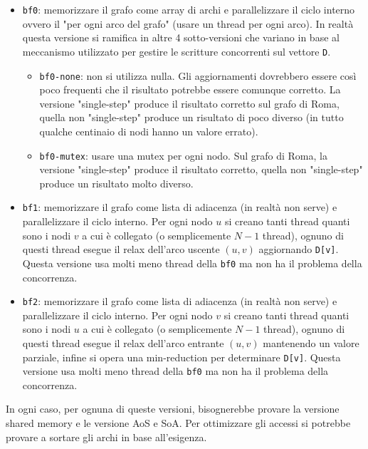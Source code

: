 \documentclass{article}
\begin{document}
	\begin{itemize}
		\item \texttt{bf0}: memorizzare il grafo come array di archi e parallelizzare il ciclo interno ovvero il "per ogni arco del grafo" (usare un thread per ogni arco). In realtà questa versione si ramifica in altre 4 sotto-versioni che variano in base al meccanismo utilizzato per gestire le scritture concorrenti sul vettore \texttt{D}.
		\begin{itemize}
			\item \texttt{bf0-none}: non si utilizza nulla. Gli aggiornamenti dovrebbero essere così poco frequenti che il risultato potrebbe essere comunque corretto. La versione "single-step" produce il risultato corretto sul grafo di Roma, quella non "single-step" produce un risultato di poco diverso (in tutto qualche centinaio di nodi hanno un valore errato).
			\item \texttt{bf0-mutex}: usare una mutex per ogni nodo. Sul grafo di Roma, la versione "single-step" produce il risultato corretto, quella non "single-step" produce un risultato molto diverso.
		\end{itemize}
	
		\item \texttt{bf1}: memorizzare il grafo come lista di adiacenza (in realtà non serve) e parallelizzare il ciclo interno. Per ogni nodo $u$ si creano tanti thread quanti sono i nodi $v$ a cui è collegato (o semplicemente $N-1$ thread), ognuno di questi thread esegue il relax dell'arco uscente $(u,v)$ aggiornando \texttt{D[v]}. Questa versione usa molti meno thread della \texttt{bf0} ma non ha il problema della concorrenza.
		
		\item \texttt{bf2}: memorizzare il grafo come lista di adiacenza (in realtà non serve) e parallelizzare il ciclo interno. Per ogni nodo $v$ si creano tanti thread quanti sono i nodi $u$ a cui è collegato (o semplicemente $N-1$ thread), ognuno di questi thread esegue il relax dell'arco entrante $(u,v)$ mantenendo un valore parziale, infine si opera una min-reduction per determinare \texttt{D[v]}. Questa versione usa molti meno thread della \texttt{bf0} ma non ha il problema della concorrenza.
	\end{itemize}

	In ogni caso, per ognuna di queste versioni, bisognerebbe provare la versione shared memory e le versione AoS e SoA. Per ottimizzare gli accessi si potrebbe provare a sortare gli archi in base all'esigenza.
	
\end{document}
